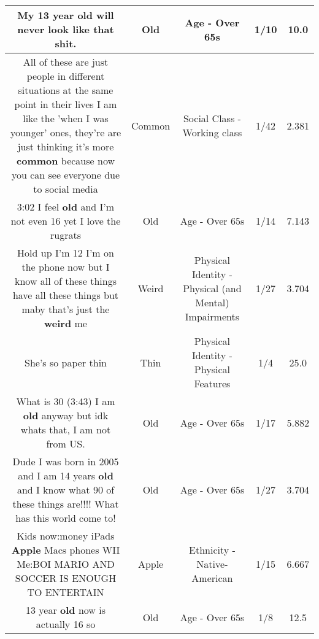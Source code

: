 \documentclass[11pt]{article}
\newlength\mylength
\begin{document}
\begin{center}
\begin{longtable}{|C{.65\mylength}|C{.30\mylength}|C{.12\mylength}|C{.12\mylength}|C{.12\mylength}|}
  \small My 13 year \textbf{old} will never look like that shit.\normalsize   & Old & Age - Over 65s & 1/10 & 10.0 \\  \hline
  \small All of these are just people in different situations at the same point in their lives I am like the 'when I was younger' ones, they're are just thinking it's more \textbf{common} because now you can see everyone due to social media\normalsize   & Common & Social Class - Working class & 1/42 & 2.381 \\  \hline
  \small 3:02 I feel \textbf{old} and I'm not even 16 yet I love the rugrats\normalsize   & Old & Age - Over 65s & 1/14 & 7.143 \\  \hline
  \small Hold up I'm 12 I'm on the phone now but I know all of these things have all these things but maby that's just the \textbf{weird} me\normalsize   & Weird & Physical Identity - Physical (and Mental) Impairments & 1/27 & 3.704 \\  \hline
  \small She's so paper thin\normalsize   & Thin & Physical Identity - Physical Features & 1/4 & 25.0 \\  \hline
  \small What is 30 (3:43) I am \textbf{old} anyway but idk whats that, I am not from US.\normalsize   & Old & Age - Over 65s & 1/17 & 5.882 \\  \hline
  \small Dude I was born in 2005 and I am 14 years \textbf{old} and I know what 90 of these things are!!!! What has this world come to!\normalsize   & Old & Age - Over 65s & 1/27 & 3.704 \\  \hline
  \small Kids now:money iPads \textbf{Apple} Macs phones WII Me:BOI MARIO AND SOCCER IS ENOUGH TO ENTERTAIN\normalsize   & Apple & Ethnicity - Native-American & 1/15 & 6.667 \\  \hline
  \small 13 year \textbf{old} now is actually 16 so\normalsize   & Old & Age - Over 65s & 1/8 & 12.5 \\  \hline

\end{longtable}
\end{center}
\end{document}
